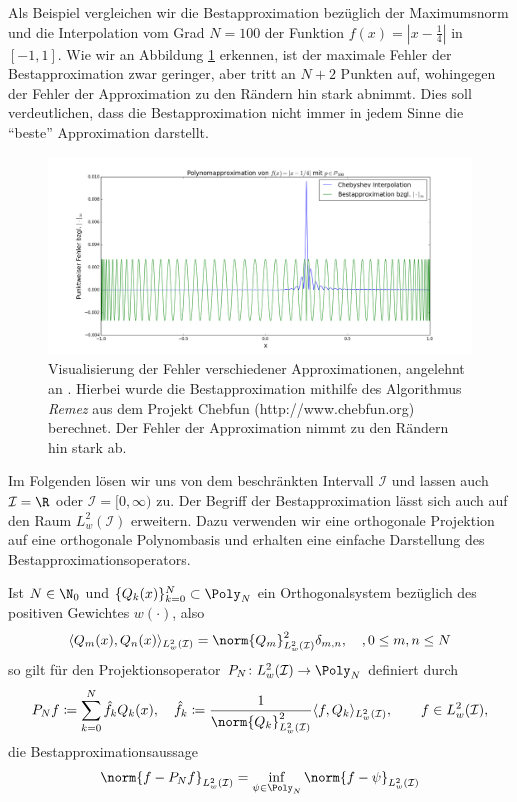 \begin{mathbsp}
Als Beispiel vergleichen wir die Bestapproximation bezüglich der Maximumsnorm und die \chebyspace Interpolation vom Grad $N=100$ der Funktion $f(x)=|x-\frac{1}{4}|$ in $[-1,1]$. Wie wir an Abbildung \ref{polyapproxcomp} erkennen, ist der maximale Fehler der Bestapproximation zwar geringer, aber tritt an $N+2$ Punkten auf, wohingegen der Fehler der \chebyspace Approximation zu den Rändern hin stark abnimmt. Dies soll verdeutlichen, dass die Bestapproximation nicht immer in jedem Sinne die "`beste"' Approximation darstellt.
\begin{figure}[ht]
 \center
 \includegraphics[width=\linewidth]{Figures/polynomial_approx_comparison.png}
 \caption{Visualisierung der Fehler verschiedener Approximationen, angelehnt an \autocite{Trefethen}. Hierbei wurde die Bestapproximation mithilfe des Algorithmus \emph{Remez} aus dem Projekt Chebfun (http://www.chebfun.org) berechnet. Der Fehler der \chebyspace Approximation nimmt zu den Rändern hin stark ab.}
 \label{polyapproxcomp}
\end{figure}
\end{mathbsp}
Im Folgenden lösen wir uns von dem beschränkten Intervall $\mathcal{I}$ und lassen auch $\mathcal{I}=\R$ oder $\mathcal{I}=[0,\infty)$ zu. Der Begriff der Bestapproximation lässt sich auch auf den Raum $L_w^2(\mathcal{I})$ erweitern. Dazu verwenden wir eine orthogonale Projektion auf eine orthogonale Polynombasis und erhalten eine einfache Darstellung des Bestapproximationsoperators.
\begin{maththeorem}
Ist $N\in\N_0$ und $\lbrace Q_k(x)\rbrace_{k=0}^N\subset \Poly_N$ ein Orthogonalsystem bezüglich des positiven Gewichtes $w(\cdot)$, also 
\[\langle Q_m(x),Q_n(x)\rangle_{L_w^2(\mathcal{I})}=\norm{Q_m}^2_{L_w^2(\mathcal{I})}\delta_{m,n},\quad, 0\le m,n\le N\]
so gilt für den Projektionsoperator $P_N\colon L_w^2(\mathcal{I})\to \Poly_N$ definiert durch 
\[P_Nf\coloneqq \sum_{k=0}^N\hat{f}_kQ_k(x),\quad \hat{f}_k\coloneqq \frac{1}{\norm{Q_k}_{L_w^2(\mathcal{I})}^2}\langle f,Q_k\rangle_{L_w^2(\mathcal{I})},\qquad f\in L^2_w(\mathcal{I}),\]
die Bestapproximationsaussage
\[\norm{f-P_Nf}_{L_w^2(\mathcal{I})}=\inf\limits_{\psi\in\Poly_N}\norm{f-\psi}_{L_w^2(\mathcal{I})}\]
\end{maththeorem}
